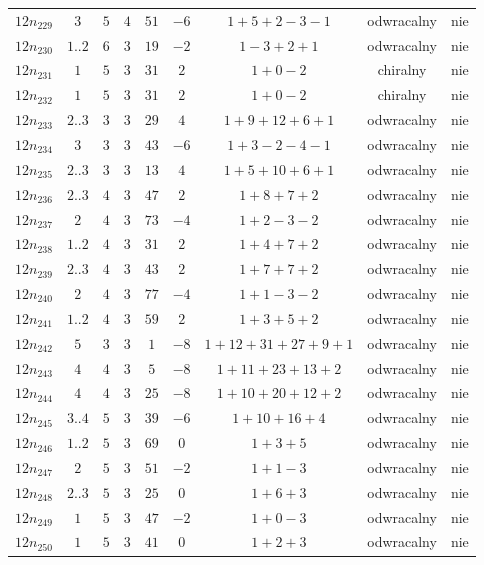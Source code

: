 \begin{longtable}{ccccccccc}
$12n_{229}$ & $3$ & $5$ & $4$ & $51$ & $-6$ & $1+5+2-3-1$ & odwracalny & nie \\
$12n_{230}$ & $1..2$ & $6$ & $3$ & $19$ & $-2$ & $1-3+2+1$ & odwracalny & nie \\
$12n_{231}$ & $1$ & $5$ & $3$ & $31$ & $2$ & $1+0-2$ & chiralny & nie \\
$12n_{232}$ & $1$ & $5$ & $3$ & $31$ & $2$ & $1+0-2$ & chiralny & nie \\
$12n_{233}$ & $2..3$ & $3$ & $3$ & $29$ & $4$ & $1+9+12+6+1$ & odwracalny & nie \\
$12n_{234}$ & $3$ & $3$ & $3$ & $43$ & $-6$ & $1+3-2-4-1$ & odwracalny & nie \\
$12n_{235}$ & $2..3$ & $3$ & $3$ & $13$ & $4$ & $1+5+10+6+1$ & odwracalny & nie \\
$12n_{236}$ & $2..3$ & $4$ & $3$ & $47$ & $2$ & $1+8+7+2$ & odwracalny & nie \\
$12n_{237}$ & $2$ & $4$ & $3$ & $73$ & $-4$ & $1+2-3-2$ & odwracalny & nie \\
$12n_{238}$ & $1..2$ & $4$ & $3$ & $31$ & $2$ & $1+4+7+2$ & odwracalny & nie \\
$12n_{239}$ & $2..3$ & $4$ & $3$ & $43$ & $2$ & $1+7+7+2$ & odwracalny & nie \\
$12n_{240}$ & $2$ & $4$ & $3$ & $77$ & $-4$ & $1+1-3-2$ & odwracalny & nie \\
$12n_{241}$ & $1..2$ & $4$ & $3$ & $59$ & $2$ & $1+3+5+2$ & odwracalny & nie \\
$12n_{242}$ & $5$ & $3$ & $3$ & $1$ & $-8$ & $1+12+31+27+9+1$ & odwracalny & nie \\
$12n_{243}$ & $4$ & $4$ & $3$ & $5$ & $-8$ & $1+11+23+13+2$ & odwracalny & nie \\
$12n_{244}$ & $4$ & $4$ & $3$ & $25$ & $-8$ & $1+10+20+12+2$ & odwracalny & nie \\
$12n_{245}$ & $3..4$ & $5$ & $3$ & $39$ & $-6$ & $1+10+16+4$ & odwracalny & nie \\
$12n_{246}$ & $1..2$ & $5$ & $3$ & $69$ & $0$ & $1+3+5$ & odwracalny & nie \\
$12n_{247}$ & $2$ & $5$ & $3$ & $51$ & $-2$ & $1+1-3$ & odwracalny & nie \\
$12n_{248}$ & $2..3$ & $5$ & $3$ & $25$ & $0$ & $1+6+3$ & odwracalny & nie \\
$12n_{249}$ & $1$ & $5$ & $3$ & $47$ & $-2$ & $1+0-3$ & odwracalny & nie \\
$12n_{250}$ & $1$ & $5$ & $3$ & $41$ & $0$ & $1+2+3$ & odwracalny & nie \\

\end{longtable}
